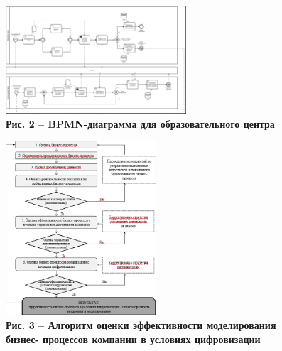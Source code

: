 \begin{figure}[H]
	\centering
	\includegraphics[width=0.6\textwidth]{assets/206}
	\caption*{\bfseries Рис. 2 -- BPMN-диаграмма для образовательного центра}
\end{figure}



\begin{figure}[H]
	\centering
	\includegraphics[width=0.5\textwidth]{assets/207}
	\caption*{\bfseries Рис. 3 -- Алгоритм оценки эффективности моделирования бизнес-
  процессов компании в условиях цифровизации}
\end{figure}

